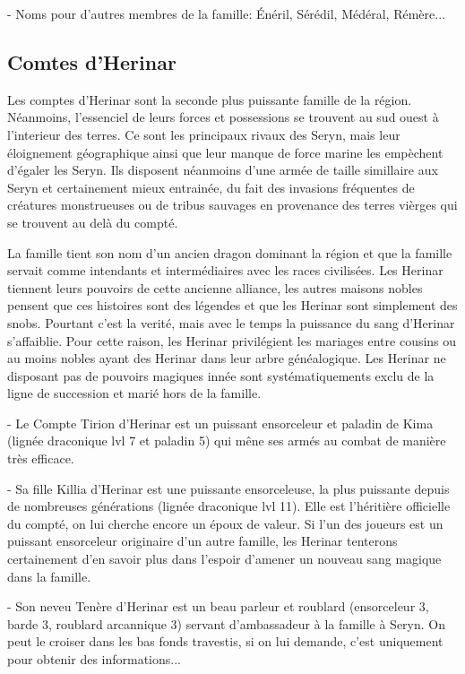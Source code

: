 - Noms pour d'autres membres de la famille: Énéril, Sérédil, Médéral, Rémère...

\subsection*{Comtes d'Herinar}

Les comptes d'Herinar sont la seconde plus puissante famille de la région. Néanmoins,
l'essenciel de leurs forces et possessions se trouvent au sud ouest à l'interieur
des terres. Ce sont les principaux rivaux des Seryn, mais leur éloignement
géographique ainsi que leur manque de force marine les empèchent d'égaler les Seryn.
Ils disposent néanmoins d'une armée de taille simillaire aux Seryn et certainement 
mieux entrainée, du fait des invasions fréquentes de créatures monstrueuses ou de
tribus sauvages en provenance des terres vièrges qui se trouvent au delà du compté. 

La famille tient son nom d'un ancien dragon dominant la région et que la famille 
servait comme intendants et intermédiaires avec les races civilisées. Les Herinar 
tiennent leurs pouvoirs de cette
ancienne alliance, les autres maisons nobles pensent que ces histoires sont des 
légendes et que les Herinar sont simplement des snobs. Pourtant c'est la verité,
mais avec le temps la puissance du sang d'Herinar s'affaiblie.
Pour cette raison, les Herinar privilégient les mariages entre cousins ou au moins
nobles ayant des Herinar dans leur arbre généalogique. Les Herinar ne disposant pas 
de pouvoirs magiques innée sont systématiquements exclu de la ligne de succession et
marié hors de la famille.

- Le Compte Tirion d'Herinar est un puissant ensorceleur et paladin de Kima
  (lignée draconique lvl 7 et paladin 5) qui mêne ses armés au combat de manière
  très efficace.

- Sa fille Killia d'Herinar est une puissante ensorceleuse, la plus puissante 
  depuis de nombreuses générations (lignée draconique lvl 11). Elle est 
  l'héritière officielle du compté, on lui cherche encore un époux de valeur.
  Si l'un des joueurs est un puissant ensorceleur originaire d'un autre famille,
  les Herinar tenterons certainement d'en savoir plus dans l'espoir d'amener un 
  nouveau sang magique dans la famille.

- Son neveu Tenère d'Herinar est un beau parleur et roublard (ensorceleur 3, 
  barde 3, roublard arcannique 3) servant d'ambassadeur à la famille à Seryn.
  On peut le croiser dans les bas fonds travestis, si on lui demande, c'est 
  uniquement pour obtenir des informations...

